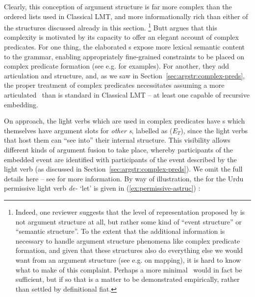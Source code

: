 \documentclass[output=paper]{langscibook}
\begin{document}
Clearly, this conception of argument structure is far more complex than the
ordered lists used in Classical LMT, and more informationally rich than either
of the structures discussed already in this section.%
%
\footnote{Indeed, one reviewer suggests that the level of representation
  proposed by \citet{Butt1995} is not argument structure at all, but rather some
  kind of ``event structure'' or ``semantic structure''. To the extent that the
  additional information is necessary to handle argument structure phenomena
  like complex predicate formation, and given that these structures also do
  everything else we would want from an argument structure (see e.g.
  \citealt[ch.~6]{Butt1995} on mapping), it is hard to know what to make of this
  complaint. Perhaps a more minimal \astruc\ would in fact be sufficient, but if
  so that is a matter to be demonstrated empirically, rather than settled by
  definitional fiat.}
%
Butt argues that this complexity is motivated by its capacity to offer an
elegant account of complex predicates. For one thing, the elaborated \astruc{}s
expose more lexical semantic content to the grammar, enabling appropriately
fine-grained constraints to be placed on complex predicate formation (see e.g.
\citealt[147--155]{Butt1995} for examples). For another, they add articulation
and structure, and, as we saw in Section~\ref{sec:argstr:complex-preds}, the proper
treatment of complex predicates necessitates assuming a more articulated
\astruc\ than is standard in Classical LMT -- at least one capable of recursive
embedding.

On  approach, the light verbs which are used in complex
predicates have \astruc{}s which themselves have argument slots for \emph{other
  \astruc{}s}, labelled as  ($E_T$), since the light
verbs that host them can ``see into'' their internal structure. This visibility
allows different kinds of argument fusion to take place, whereby participants of
the embedded event are identified with participants of the event described by
the light verb (as discussed in Section~\ref{sec:argstr:complex-preds}). We omit the
full details here -- see \citet[ch.~5]{Butt1995} for more information. By way of
illustration, the \astruc{} for the Urdu permissive light verb \textit{de-}
`let' is given in (\ref{ex:permissive-astruc}) \citep[156]{Butt1995}:
\end{document}

